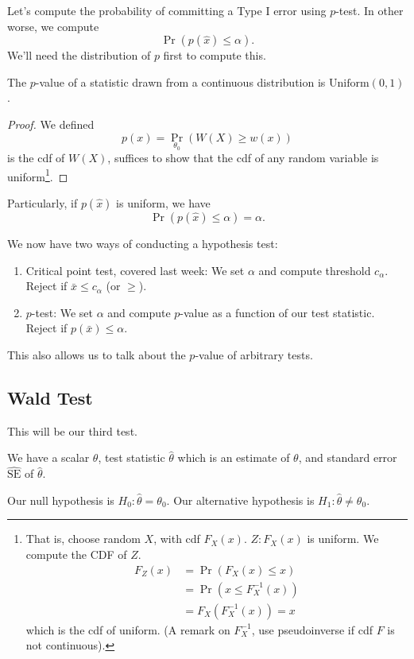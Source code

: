 Let's compute the probability of committing a Type I error using $p$-test. In other worse, we compute
\[\Pr(p(\hat{x})\leq \alpha).\]
We'll need the distribution of $p$ first to compute this.

\begin{lemma}
    The $p$-value of a statistic drawn from a continuous distribution is $\mathrm{Uniform}(0, 1)$.
\end{lemma}
\begin{proof}
    We defined
    \[p(x) = \Pr_{\theta_0}(W(X)\geq w(x))\]
    is the cdf of $W(X)$, suffices to show that the cdf of any random variable is uniform\footnote{
        That is, choose random $X$, with cdf $F_X(x)$. $Z: F_X(x)$ is uniform. We compute the CDF of $Z$.
        \begin{align*}
            F_Z(x) & = \Pr(F_X(x)\leq x)      \\
                   & = \Pr(x\leq F_X^{-1}(x)) \\
                   & = F_X(F_X^{-1}(x)) = x
        \end{align*}
        which is the cdf of uniform. (A remark on $F^{-1}_X$, use pseudoinverse if cdf $F$ is not continuous).
    }.
\end{proof}

Particularly, if $p(\hat{x})$ is uniform, we have
\[\Pr(p(\hat{x})\leq \alpha) = \alpha.\]

We now have two ways of conducting a hypothesis test:
\begin{enumerate}
    \item Critical point test, covered last week: We set $\alpha$ and compute threshold $c_\alpha$. Reject if $\bar{x}\leq c_\alpha$ (or $\geq$).
    \item $p$-test: We set $\alpha$ and compute $p$-value as a function of our test statistic. Reject if $p(\bar{x})\leq \alpha$.
\end{enumerate}

This also allows us to talk about the $p$-value of arbitrary tests.

\subsection{Wald Test}
This will be our third test.

We have a scalar $\theta$, test statistic $\hat{\theta}$ which is an estimate of $\theta$, and standard error $\hat{\mathrm{SE}}$ of $\hat{\theta}$.

Our null hypothesis is $H_0: \hat{\theta} = \theta_0$. Our alternative hypothesis is $H_1 : \hat{\theta}\neq \theta_0$.

